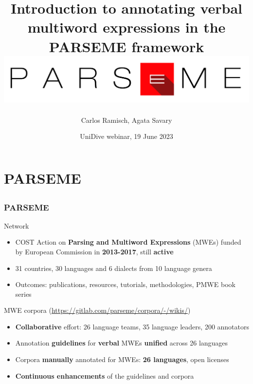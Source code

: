 \documentclass[xcolor=dvipsnames]{beamer}
\title[PARSEME Intro]{Introduction to annotating verbal multiword expressions in the PARSEME framework\\\vspace{0.3cm}\includegraphics[scale=0.3]{Images/parseme-logo.png}}
\author{Carlos Ramisch, Agata Savary}
\institute[shortinst]{Aix-Marseille Université, Université Paris-Saclay, France}
\date[UniDive, 19/06/2023]{UniDive webinar, 19 June 2023}
\begin{document}
\begin{frame}

\titlepage
\end{frame}

\section{PARSEME} 
\subsection{}

\begin{frame}
  \frametitle{PARSEME}
  
\begin{scriptsize}
  
\begin{block}{Network}
\begin{itemize}
\item COST Action on \textbf{Parsing and Multiword Expressions} (MWEs) funded by European Commission in \textbf{2013-2017}, still \textbf{active}
\item 31 countries, 30 languages and 6 dialects from 10 language genera
\item Outcomes: publications, resources, tutorials, methodologies, PMWE book series 
\end{itemize}
\end{block}

\begin{block}{MWE corpora (\textcolor{magenta}{\url{https://gitlab.com/parseme/corpora/-/wikis/}})}
\begin{itemize}
\item \textbf{Collaborative} effort: 26 language teams, 35 language leaders, 200 annotators
\item Annotation \textbf{guidelines} for \textbf{verbal} MWEs \textbf{unified} across 26 languages
\item Corpora \textbf{manually} annotated for MWEs: \textbf{26 languages}, open licenses
\item \textbf{Continuous enhancements} of the guidelines and corpora
\end{itemize}
\end{block}

\end{scriptsize}


\end{frame}
\end{document}
